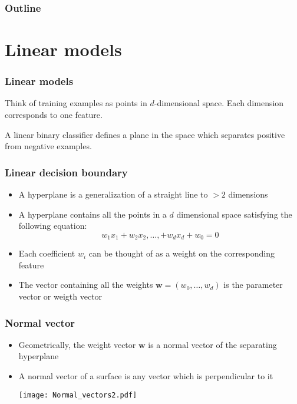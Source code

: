 \documentclass[14pt,mathserif]{beamer}
\author[Chrupala and Stroppa]{Grzegorz Chrupa{\l}a and Nicolas Stroppa}
\institute[Saarland+Google] %
{
Saarland University\\
Google
}
\date[2010] %
{META Workshop}
\newcommand{\w}{\mathbf{w}}
\begin{document}
\frame{\titlepage}

\begin{frame}
  \frametitle{Outline}
  \tableofcontents
\end{frame}

\section{Linear models}

\begin{frame}
  \frametitle{Linear models}
  \begin{block}{}
    Think of training examples as points in $d$-dimensional
    space. Each dimension corresponds to one feature.
  \end{block}
  \begin{block}{}
    A linear binary classifier defines a plane in the space which
    separates positive from negative examples. 
  \end{block}

\end{frame}

\begin{frame}
 \frametitle{Linear decision boundary}
\begin{itemize}
\item A \alert{hyperplane} is a generalization of a straight line to
  $>2$ dimensions
\item A hyperplane contains all the points in a $d$ dimensional space satisfying the following equation:
\[
 w_1x_1 + w_2x_2, \ldots, + w_dx_d + w_0 = 0
\]
\item Each coefficient $w_i$ can be thought of as a weight on the
  corresponding feature
\item The vector containing all the weights $\w = (w_0,\ldots,w_d)$ is the
  \alert{parameter vector} or \alert{weigth vector}
\end{itemize}
\end{frame}



\begin{frame}
 \frametitle{Normal vector}
\begin{itemize}
\item Geometrically, the weight vector $\w$ is a \alert{normal vector}
  of the separating hyperplane
\item A normal vector of a surface is any vector which is
  perpendicular to it
\begin{center}
 \texttt{[image: Normal\_vectors2.pdf]}
 \end{center}
\end{itemize}
\end{frame}
\end{document}
